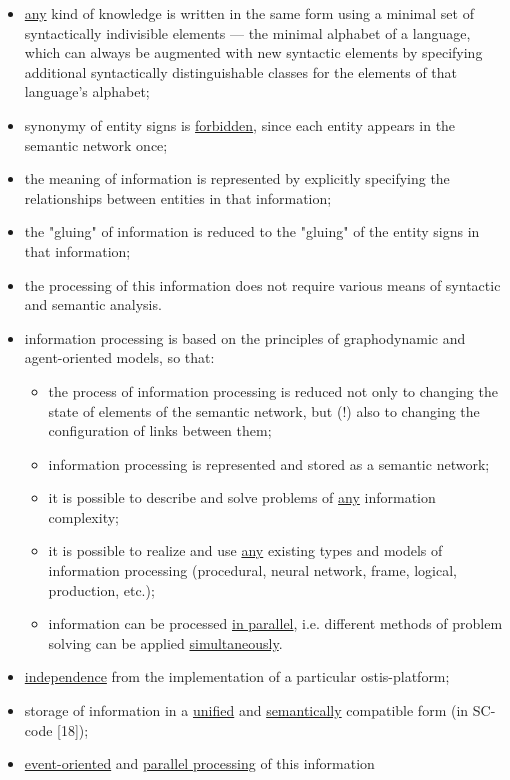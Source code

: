 \documentclass{article}
\begin{document}
\begin{multicols}{2}
\begin{itemize}
\begin{itemize}
\item \underline{any} kind of knowledge is written in the same form
using a minimal set of syntactically indivisible
elements — the minimal alphabet of a language,
which can always be augmented with new syntactic elements by specifying additional syntactically
distinguishable classes for the elements of that
language’s alphabet;
\item synonymy of entity signs is \underline{forbidden}, since each
entity appears in the semantic network once;
\item the meaning of information is represented by
explicitly specifying the relationships between
entities in that information;
\item the "gluing" of information is reduced to the
"gluing" of the entity signs in that information;
\item the processing of this information does not require various means of syntactic and semantic
analysis.

\end{itemize}

\end{itemize}
\begin{itemize}
\item information processing is based on the principles of
graphodynamic and agent-oriented models, so that:
\begin{itemize}
\item the process of information processing is reduced
not only to changing the state of elements of the
semantic network, but (!) also to changing the
configuration of links between them;
\item information processing is represented and stored
as a semantic network;
\item it is possible to describe and solve problems of  \underline{any} information complexity;
\item it is possible to realize and use \underline{any} existing types
and models of information processing (procedural, neural network, frame, logical, production,
etc.);
\item information can be processed \underline{in parallel}, i.e. different methods of problem solving can be applied \underline{simultaneously}.
\end{itemize}
\end{itemize}
\begin{itemize}
\item \underline{independence} from the implementation of a particular ostis-platform;
\item storage of information in a \underline{unified} and
 \underline{semantically} compatible form (in SC-code [18]);
\item \underline{event-oriented} and \underline{parallel processing}  of this information
    

\end{itemize}
\end{multicols}
\end{document}
